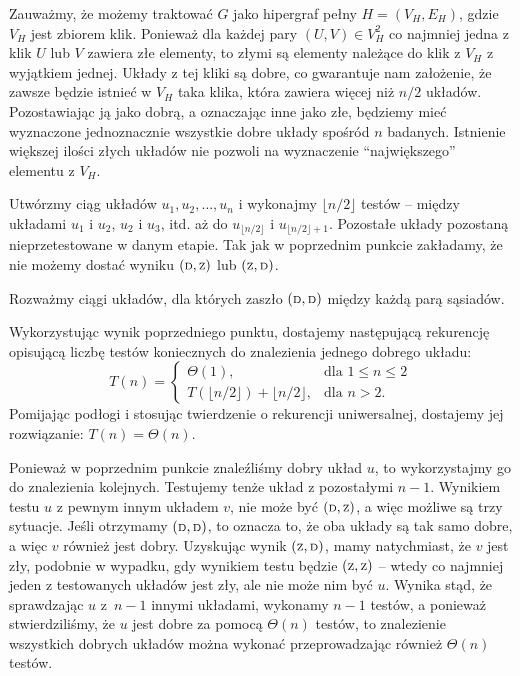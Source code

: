 Zauważmy, że możemy traktować $G$ jako hipergraf pełny $H=(V_H,E_H)$, gdzie $V_H$ jest zbiorem klik. Ponieważ dla każdej pary $(U,V)\in V_H^2$ co najmniej jedna z klik $U$ lub $V$ zawiera złe elementy, to złymi są elementy należące do klik z $V_H$ z wyjątkiem jednej. Układy z tej kliki są dobre, co gwarantuje nam założenie, że zawsze będzie istnieć w $V_H$ taka klika, która zawiera więcej niż $n/2$ układów. Pozostawiając ją jako dobrą, a oznaczając inne jako złe, będziemy mieć wyznaczone jednoznacznie wszystkie dobre układy spośród $n$ badanych. Istnienie większej ilości złych układów nie pozwoli na wyznaczenie ``największego'' elementu z $V_H$.

Utwórzmy ciąg układów $u_1,u_2,\dots,u_n$ i wykonajmy $\lfloor n/2\rfloor$ testów -- między układami $u_1$ i $u_2$, $u_2$ i $u_3$, itd. aż do $u_{\lfloor n/2\rfloor}$ i $u_{\lfloor n/2\rfloor+1}$. Pozostałe układy pozostaną nieprzetestowane w danym etapie. Tak jak w poprzednim punkcie zakładamy, że nie możemy dostać wyniku $({\scriptstyle\rm D},{\scriptstyle\rm Z})$ lub $({\scriptstyle\rm Z},{\scriptstyle\rm D})$.

Rozważmy ciągi układów, dla których zaszło $({\scriptstyle\rm D},{\scriptstyle\rm D})$ między każdą parą sąsiadów. 

\subexercise{} %
Wykorzystując wynik poprzedniego punktu, dostajemy następującą rekurencję opisującą liczbę testów koniecznych do znalezienia jednego dobrego układu:
\[
	T(n) =
	\begin{cases}
		\Theta(1), & \text{dla $1\le n\le2$} \\
		T(\lfloor n/2\rfloor) + \lfloor n/2\rfloor, & \text{dla $n>2$}.
	\end{cases}
\]
Pomijając podłogi i stosując twierdzenie o rekurencji uniwersalnej, dostajemy jej rozwiązanie: $T(n)=\Theta(n)$.

Ponieważ w poprzednim punkcie znaleźliśmy dobry układ $u$, to wykorzystajmy go do znalezienia kolejnych. Testujemy tenże układ z pozostałymi $n-1$. Wynikiem testu $u$ z pewnym innym układem $v$, nie może być $({\scriptstyle\rm D},{\scriptstyle\rm Z})$, a więc możliwe są trzy sytuacje. Jeśli otrzymamy $({\scriptstyle\rm D},{\scriptstyle\rm D})$, to oznacza to, że oba układy są tak samo dobre, a więc $v$ również jest dobry. Uzyskując wynik $({\scriptstyle\rm Z},{\scriptstyle\rm D})$, mamy natychmiast, że $v$ jest zły, podobnie w wypadku, gdy wynikiem testu będzie $({\scriptstyle\rm Z},{\scriptstyle\rm Z})$ -- wtedy co najmniej jeden z testowanych układów jest zły, ale nie może nim być $u$. Wynika stąd, że sprawdzając $u$ z~$n-1$ innymi układami, wykonamy $n-1$ testów, a ponieważ stwierdziliśmy, że $u$ jest dobre za pomocą $\Theta(n)$ testów, to znalezienie wszystkich dobrych układów można wykonać przeprowadzając również $\Theta(n)$ testów.


